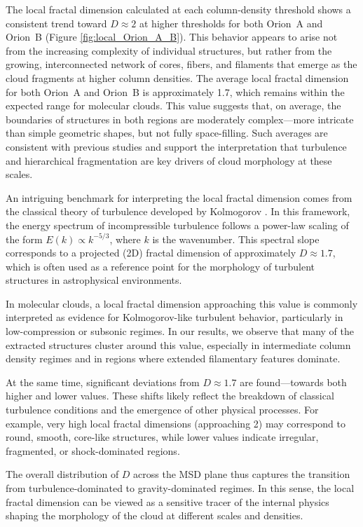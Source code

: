 The local fractal dimension calculated at each column‑density threshold shows a consistent trend toward \(D \approx 2\) at higher thresholds for both Orion~A and Orion~B (Figure \ref{fig:local_Orion_A_B}).  
This behavior appears to arise not from the increasing complexity of individual structures, but rather from the growing, interconnected network of cores, fibers, and filaments that emerge as the cloud fragments at higher column densities.
The average local fractal dimension for both Orion~A and Orion~B is approximately 1.7, which remains within the expected range for molecular clouds. This value suggests that, on average, the boundaries of structures in both regions are moderately complex—more intricate than simple geometric shapes, but not fully space-filling. Such averages are consistent with previous studies and support the interpretation that turbulence and hierarchical fragmentation are key drivers of cloud morphology at these scales.

An intriguing benchmark for interpreting the local fractal dimension comes from the classical theory of turbulence developed by Kolmogorov \cite{kolmogorov1962refinement}.  
In this framework, the energy spectrum of incompressible turbulence follows a power-law scaling of the form \( E(k) \propto k^{-5/3} \), where \( k \) is the wavenumber.  
This spectral slope corresponds to a projected (2D) fractal dimension of approximately \( D \approx 1.7 \), which is often used as a reference point for the morphology of turbulent structures in astrophysical environments.

In molecular clouds, a local fractal dimension approaching this value is commonly interpreted as evidence for Kolmogorov-like turbulent behavior, particularly in low-compression or subsonic regimes.  
In our results, we observe that many of the extracted structures cluster around this value, especially in intermediate column density regimes and in regions where extended filamentary features dominate.

At the same time, significant deviations from \( D \approx 1.7 \) are found—towards both higher and lower values.  
These shifts likely reflect the breakdown of classical turbulence conditions and the emergence of other physical processes.  
For example, very high local fractal dimensions (approaching 2) may correspond to round, smooth, core-like structures, while lower values indicate irregular, fragmented, or shock-dominated regions.

The overall distribution of \( D \) across the MSD plane thus captures the transition from turbulence-dominated to gravity-dominated regimes.  
In this sense, the local fractal dimension can be viewed as a sensitive tracer of the internal physics shaping the morphology of the cloud at different scales and densities.


